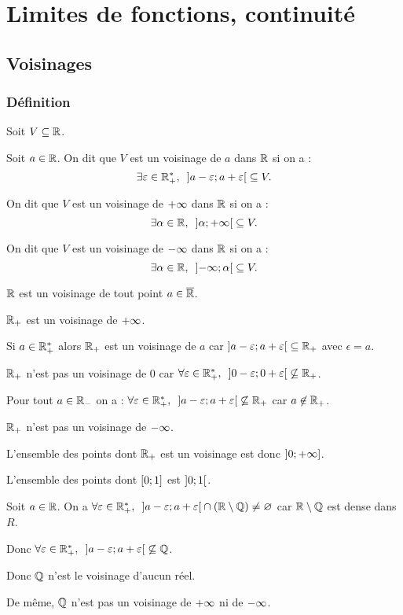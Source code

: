 \chapter{Limites de fonctions, continuité}

\minitoc

\section{Voisinages}

\subsection{Définition}

\begin{defi}
Soit \(V\subseteq\mathbb{R}\).

Soit \(a\in\mathbb{R}\). On dit que \(V\) est un voisinage de \(a\) dans \(\mathbb{R}\) si on a : \[\quantifs{\exists\epsilon\in\Rps}\intervee{a-\epsilon}{a+\epsilon}\subset V.\]

On dit que \(V\) est un voisinage de \(+\infty\) dans \(\mathbb{R}\) si on a : \[\quantifs{\exists\alpha\in\R}\intervee{\alpha}{\pinf}\subset V.\]

On dit que \(V\) est un voisinage de \(-\infty\) dans \(\mathbb{R}\) si on a : \[\quantifs{\exists\alpha\in\R}\intervee{\minf}{\alpha}\subset V.\]
\end{defi}

\begin{ex}
\(\mathbb{R}\) est un voisinage de tout point \(a\in\overline{\mathbb{R}}\).

\(\mathbb{R}_+\) est un voisinage de \(+\infty\).

Si \(a\in\mathbb{R}_+^*\) alors \(\mathbb{R}_+\) est un voisinage de \(a\) car \(\left]a-\varepsilon;a+\varepsilon\right[\subseteq\mathbb{R}_+\) avec \(\epsilon=a\).

\(\mathbb{R}_+\) n'est pas un voisinage de \(0\) car \(\quantifs{\forall\epsilon\in\Rps}\intervee{0-\epsilon}{0+\epsilon}\not\subset\Rp\).

Pour tout \(a\in\mathbb{R}_-\) on a : \(\quantifs{\forall\epsilon\in\Rps}\intervee{a-\epsilon}{a+\epsilon}\not\subset\Rp\) car \(a\not\in\mathbb{R}_+\).

\(\mathbb{R}_+\) n'est pas un voisinage de \(-\infty\).

L'ensemble des points dont \(\mathbb{R}_+\) est un voisinage est donc \(\left]0;+\infty\right]\).

L'ensemble des points dont \(\left[0;1\right]\) est \(\left]0;1\right[\).

Soit \(a\in\mathbb{R}\). On a \(\quantifs{\forall\epsilon\in\Rps}\intervee{a-\epsilon}{a+\epsilon}\inter\paren{\R\excluant\Q}\not=\ensvide\) car \(\mathbb{R}\setminus\mathbb{Q}\) est dense dans \(R\).

Donc \(\quantifs{\forall\epsilon\in\Rps}\intervee{a-\epsilon}{a+\epsilon}\not\subset\Q\).

Donc \(\mathbb{Q}\) n'est le voisinage d'aucun réel.

De même, \(\mathbb{Q}\) n'est pas un voisinage de \(+\infty\) ni de \(-\infty\).
\end{ex}

